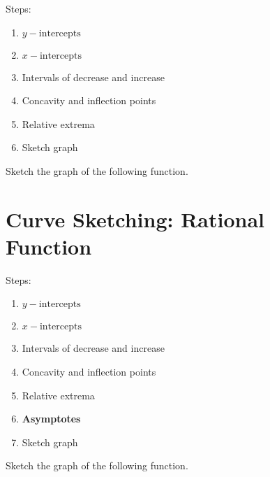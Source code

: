 \begin{myframe}[arc=10pt,auto outer arc]
	Steps:
	\begin{enumerate}
		\item $y-\textrm{intercepts}$
		\item $x-\textrm{intercepts}$
		\item Intervals of decrease and increase
		\item Concavity and inflection points
		\item Relative extrema
		\item Sketch graph
	\end{enumerate}
\end{myframe}

\noindent Sketch the graph of the following function.



\makenewpage
\section{Curve Sketching: Rational Function}

\begin{myframe}[arc=10pt,auto outer arc]
	Steps:
	\begin{enumerate}
		\item $y-\textrm{intercepts}$
		\item $x-\textrm{intercepts}$
		\item Intervals of decrease and increase
		\item Concavity and inflection points
		\item Relative extrema
		\item \textbf{Asymptotes}
		\item Sketch graph
	\end{enumerate}
\end{myframe}

\noindent Sketch the graph of the following function.



